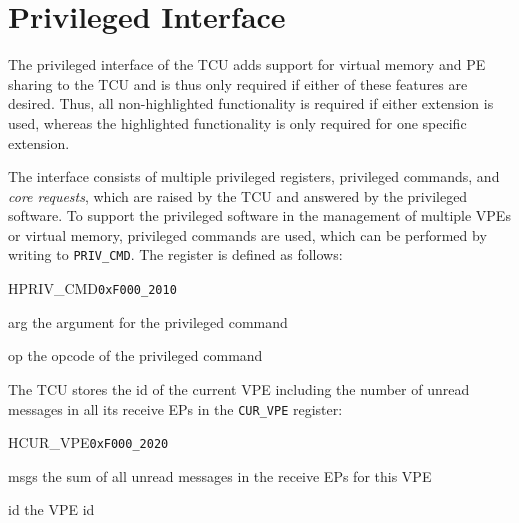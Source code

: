 \chapter{Privileged Interface}

The privileged interface of the TCU adds support for virtual memory and PE sharing to the TCU and is
thus only required if either of these features are desired. Thus, all non-highlighted functionality
is required if either extension is used, whereas the highlighted functionality is only required for
one specific extension.

The interface consists of multiple privileged registers, privileged commands, and \emph{core
requests}, which are raised by the TCU and answered by the privileged software. To support the
privileged software in the management of multiple VPEs or virtual memory, privileged commands are
used, which can be performed by writing to \texttt{PRIV\_CMD}. The register is defined as follows:

\begin{register}{H}{PRIV\_CMD}{\texttt{0xF000\_2010}}
  \regnewline%
  \begin{regdesc}\begin{reglist}
    \item[arg] the argument for the privileged command
    \item[op] the opcode of the privileged command
  \end{reglist}\end{regdesc}
\end{register}

\noindent The TCU stores the id of the current VPE including the number of unread messages in all
its receive EPs in the \texttt{CUR\_VPE} register:

\setlength{\regWidth}{.95\textwidth}
\begin{register}{H}{CUR\_VPE}{\texttt{0xF000\_2020}}
  \regnewline%
  \begin{regdesc}\begin{reglist}
    \item[msgs] the sum of all unread messages in the receive EPs for this VPE
    \item[id] the VPE id
  \end{reglist}\end{regdesc}
\end{register}
\setlength{\regWidth}{\textwidth}
\extend{}

